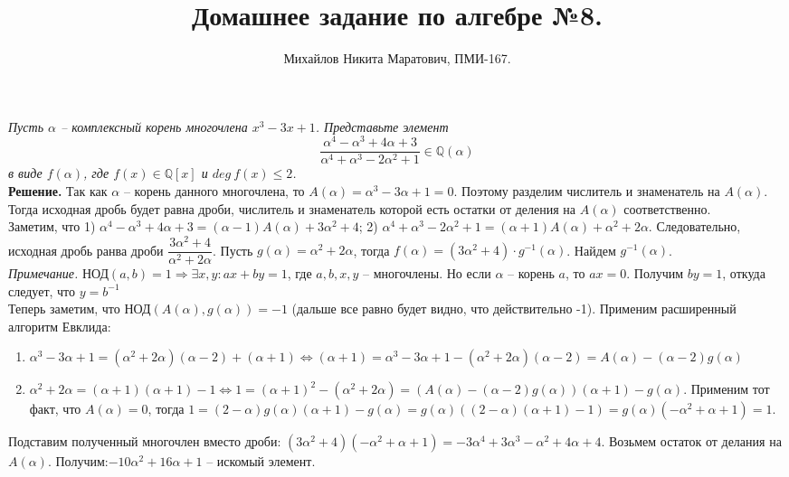 \documentclass[a4paper, 12pt]{article}
\title{
     Домашнее задание по алгебре №8.
 }
\author{Михайлов Никита Маратович, ПМИ-167.
}
\date{}
\newcommand{\Q}{\mathbb{Q}}
\newcommand{\al}{\alpha}
\newcommand{\GCD}{\text{НОД}}
\begin{document}
\maketitle
\begin{spacing}{1}



\begin{center}
\end{center}

\noindent \textit{Пусть $\alpha$ -- комплексный корень многочлена $x^3-3x+1$. Представьте элемент
	$$
	\frac{\al^4 - \al^3+4\al+3}{\al^4+\al^3-2\al^2+1} \in \Q(\al)
	$$
	в виде $f(\al)$, где $f(x) \in \Q[x]$ и $deg\:f(x) \leq 2$.	
}\\
\noindent \textbf{Решение.} Так как $\al$ -- корень данного многочлена, то $A(\al) = \al^3-3\al+1 = 0$. Поэтому разделим числитель и знаменатель на $A(\al)$. Тогда исходная дробь будет равна дроби, числитель и знаменатель которой есть остатки от деления на $A(\al)$ соответственно. \\
Заметим, что 1) $\al^4 - \al^3+4\al+3 = (\al - 1)A(\al) + 3\al^2+4$; 2) $\al^4+\al^3-2\al^2+1 = (\al+1)A(\al) + \al^2+2\al$. Следовательно, исходная дробь ранва дроби $\dfrac{3\al^2+4}{\al^2+2\al}$. Пусть $g(\al)=\al^2+2\al$, тогда $f(\al) = (3\al^2+4) \cdot g^{-1}(\al)$. Найдем $g^{-1}(\al)$.\\
\textit{Примечание. } $\GCD(a,b) = 1 \Rightarrow \exists x,y: ax+by=1$, где $a, b, x, y$ -- многочлены. Но если $\al$ -- корень $a$, то $ax = 0$. Получим $by = 1$, откуда следует, что $y = b^{-1}$\\
Теперь заметим, что $\GCD(A(\al), g(\al)) = -1$ (дальше все равно будет видно, что действительно -1). Применим  расширенный алгоритм Евклида:
\begin{enumerate}
	\item $\al^3-3\al+1 = (\al^2+2\al)(\al-2) + (\al + 1) \Leftrightarrow (\al+1)=\al^3-3\al+1 - (\al^2+2\al)(\al-2) = A(\al)-(\al-2)g(\al)$
	\item $\al^2+2\al = (\al+1)(\al+1) - 1 \Leftrightarrow 1 = (\al+1)^2-(\al^2+2\al) = (A(\al)-(\al-2)g(\al))(\al+1) - g(\al)$. Применим тот факт, что $A(\al) = 0$, тогда $1 = (2-\al)g(\al)(\al + 1)- g(\al) = g(\al)((2-\al)(\al+1)-1) = g(\al)(-\al^2+\al+1) = 1$. 
\end{enumerate}
Подставим полученный многочлен вместо дроби: $(3\al^2+4)(-\al^2+\al+1) = -3\al^4+3\al^3-\al^2+4\al+4$. Возьмем остаток от делания на $A(\al)$. Получим:$-10\al^2+16\al+1$ -- искомый элемент.





\end{spacing}
\end{document}
